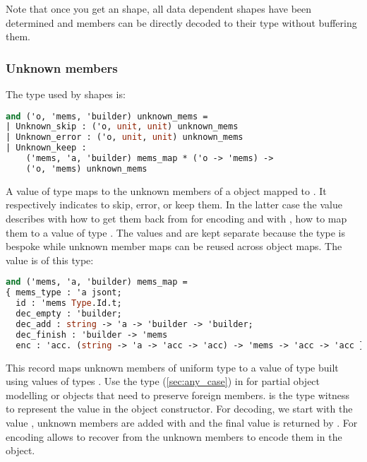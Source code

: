 \documentclass[nolinenum]{jfp}
\begin{document}
Note that once you get an  shape, all data dependent
shapes have been determined and members can be directly decoded to
their type without buffering them.


\subsubsection{Unknown members}
\label{sec:unknown_mems}

The type  used by  shapes is:

\begin{lstlisting}[language=ocaml]
and ('o, 'mems, 'builder) unknown_mems =
| Unknown_skip : ('o, unit, unit) unknown_mems
| Unknown_error : ('o, unit, unit) unknown_mems
| Unknown_keep :
    ('mems, 'a, 'builder) mems_map * ('o -> 'mems) ->
    ('o, 'mems) unknown_mems
\end{lstlisting}
%
A value  of type  maps to  the
unknown members of a \json{} object mapped to . It
respectively indicates to skip, error, or keep them. In the latter
case the  value describes with  how
to get them back from  for encoding and with , how to map
them to a value of type . The values  and
 are kept separate because the type  is bespoke while
unknown member maps can be reused across object maps. The value
 is of this type:
%
\begin{lstlisting}[language=ocaml]
and ('mems, 'a, 'builder) mems_map =
{ mems_type : 'a jsont;
  id : 'mems Type.Id.t;
  dec_empty : 'builder;
  dec_add : string -> 'a -> 'builder -> 'builder;
  dec_finish : 'builder -> 'mems
  enc : 'acc. (string -> 'a -> 'acc -> 'acc) -> 'mems -> 'acc -> 'acc }
\end{lstlisting}
%
This record maps unknown members of uniform \json{} type
 to a value of type  built using values
of types . Use the \json{} type 
(\autoref{sec:any_case}) in  for partial object
modelling or objects that need to preserve foreign
members.  is the type witness to represent the 
value in the object constructor. For decoding, we start with the value
, unknown members are added with 
and the final  value is returned by
. For encoding  allows to recover from
 the unknown members to encode them in the \json{} object.
\end{document}
